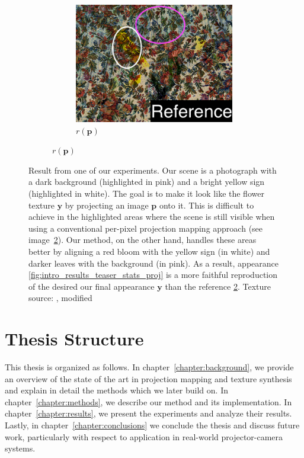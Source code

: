 \begin{figure}[ht]
\begin{subfigure}{\textwidth}
\begin{subfigure}{0.3\textwidth}
            \centering
            \includegraphics[width=\textwidth]{images/01-results_teaser-pixels_proj_highlighted2.jpg}
            \caption{\(r(\bm{p})\)}
            \label{fig:intro_results_teaser_pixels_proj}
        \end{subfigure}
        
    \end{subfigure}
    \caption{Result from one of our experiments. Our scene is a photograph with a dark background (highlighted in pink) and a bright yellow sign (highlighted in white). The goal is to make it look like the flower texture \(\bm{y}\) by projecting an image \(\bm{p}\) onto it. This is difficult to achieve in the highlighted areas where the scene is still visible when using a conventional per-pixel projection mapping approach (see image~\ref{fig:intro_results_teaser_pixels_proj}). Our method, on the other hand, handles these areas better by aligning a red bloom with the yellow sign (in white) and darker leaves with the background (in pink). As a result, appearance \ref{fig:intro_results_teaser_stats_proj} is a more faithful reproduction of the desired our final appearance \(\bm{y}\) than the reference \ref{fig:intro_results_teaser_pixels_proj}. Texture source: \citet{Pixar128}, modified}
    \label{fig:intro_result_teaser}
\end{figure}

\section{Thesis Structure}
\label{section:intro-thesis_structure}

This thesis is organized as follows. In chapter~\ref{chapter:background}, we provide an overview of the state of the art in projection mapping and texture synthesis and explain in detail the methods which we later build on. In chapter~\ref{chapter:methods}, we describe our method and its implementation. In chapter~\ref{chapter:results}, we present the experiments and analyze their results. Lastly, in chapter~\ref{chapter:conclusions} we conclude the thesis and discuss future work, particularly with respect to application in real-world projector-camera systems.
